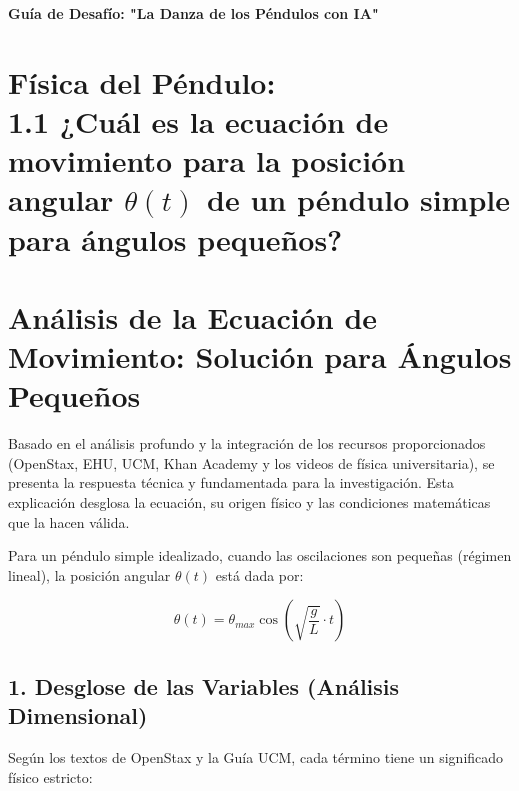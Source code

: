 \documentclass[12pt, a4paper]{article}
\begin{document}
	
	\begin{center}
		\LARGE \textbf{Guía de Desafío: "La Danza de los Péndulos con IA"}
	\end{center}
	\vspace{0.1cm}
	
	\section*{Física del Péndulo: \\  1.1 ¿Cuál es la ecuación de movimiento para la posición angular $\theta(t)$ de un péndulo simple para ángulos pequeños?}
	
	
	
	\vspace{0.2cm}
	
	
	\section{Análisis de la Ecuación de Movimiento: Solución para Ángulos Pequeños}
	
	Basado en el análisis profundo y la integración de los recursos proporcionados (OpenStax, EHU, UCM, Khan Academy y los videos de física universitaria), se presenta la respuesta técnica y fundamentada para la investigación. Esta explicación desglosa la ecuación, su origen físico y las condiciones matemáticas que la hacen válida.
	
	Para un péndulo simple idealizado, cuando las oscilaciones son pequeñas (régimen lineal), la posición angular $\theta(t)$ está dada por:
	
	\begin{equation}
		\theta(t) = \theta_{max} \cos\left(\sqrt{\frac{g}{L}} \cdot t\right)
		\label{eq:movimiento_pendulo}
	\end{equation}
	
	\subsection{1. Desglose de las Variables (Análisis Dimensional)}
	Según los textos de OpenStax y la Guía UCM, cada término tiene un significado físico estricto:
	
\end{document}

